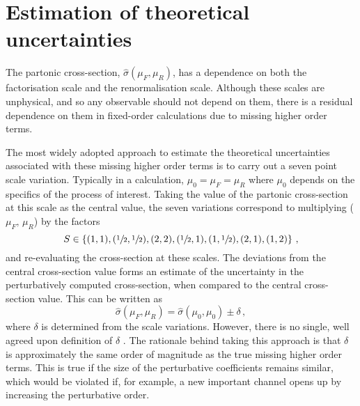 \documentclass[main.tex]{subfiles}
\begin{document}
    \section{Estimation of theoretical uncertainties}\label{sec:scale_variations}
    The partonic cross-section, $\hat{\sigma}(\mu_{F}, \mu_{R})$, has
    a dependence on both the factorisation scale and the
    renormalisation scale. Although these scales are unphysical,
    and so any observable should not depend on them,
    there is a residual dependence on them in fixed-order
    calculations due to missing higher order terms.

    The most widely adopted approach to estimate the
    theoretical uncertainties associated with these
    missing higher order terms is to carry out a seven point
    scale variation. Typically in a calculation,
    $\mu_{0} = \mu_{F} = \mu_{R}$ where $\mu_{0}$ depends on the specifics
    of the process of interest. Taking the value of the
    partonic cross-section at this scale as the central value,
    the seven variations correspond to multiplying ($\mu_{F}, \, \mu_{R}$) by the factors 
    \begin{equation}\label{eqn:scale_variations}
        S \in \left\{(1, 1), (\sfrac{1}{2}, \sfrac{1}{2}), (2, 2), (\sfrac{1}{2}, 1), (1, \sfrac{1}{2}), (2, 1), (1, 2) \right\} \, ,
    \end{equation}
    and re-evaluating the cross-section at these scales.
    The deviations from the central cross-section value
    forms an estimate of the uncertainty in the perturbatively
    computed cross-section, when compared to the central cross-section value.
    This can be written as
    \begin{equation}
        \hat{\sigma}(\mu_{F}, \mu_{R}) = \hat{\sigma}(\mu_{0}, \mu_{0}) \pm \delta \, ,
    \end{equation}
    where $\delta$ is determined from the scale variations.
    However, there is no single, well agreed upon definition
    of $\delta$ \cite{Cacciari:2011ze}.
    The rationale behind taking this approach is that $\delta$
    is approximately the same order of magnitude as the true missing
    higher order terms. This is true if the size of the perturbative
    coefficients remains similar, which would be violated if, for example,
    a new important channel opens up by increasing the perturbative
    order.
\end{document}
